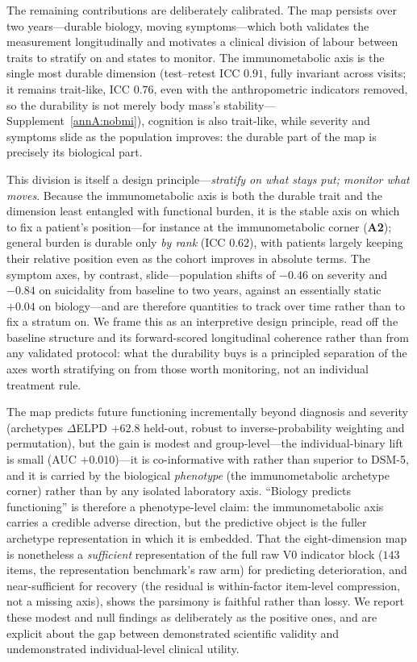 The remaining contributions are deliberately calibrated. The map persists over two
years---durable biology, moving symptoms---which both validates the measurement
longitudinally and motivates a clinical division of labour between traits to stratify
on and states to monitor. The immunometabolic axis is the single most durable
dimension (test--retest ICC $0.91$, fully invariant across visits; it remains trait-like,
ICC $0.76$, even with the anthropometric indicators removed, so the durability is not merely
body mass's stability---Supplement~\ref{annA:nobmi}), cognition is also
trait-like, while severity and symptoms slide as the population improves: the durable
part of the map is precisely its biological part.

This division is itself a design principle---\emph{stratify on what stays put; monitor
what moves}. Because the immunometabolic axis is both the durable trait and the
dimension least entangled with functional burden, it is the stable axis on which to fix a
patient's position---for instance at the immunometabolic corner (\textbf{A2}); general
burden is durable only \emph{by rank} (ICC $0.62$), with patients largely keeping their
relative position even as the cohort improves in absolute terms. The symptom axes, by
contrast, slide---population shifts of $-0.46$ on severity and $-0.84$ on suicidality from
baseline to two years, against an essentially static $+0.04$ on biology---and are
therefore quantities to track over time rather than to fix a stratum on. We frame this as
an interpretive design principle, read off the baseline structure and its forward-scored
longitudinal coherence rather than from any validated protocol: what the durability buys
is a principled separation of the axes worth stratifying on from those worth monitoring,
not an individual treatment rule.

The map predicts future functioning
incrementally beyond diagnosis and severity (archetypes $\Delta$ELPD $+62.8$
held-out, robust to inverse-probability weighting and permutation), but the gain is
modest and group-level---the individual-binary lift is small (AUC $+0.010$)---it is
co-informative with rather than superior to DSM-5, and it is carried by the biological
\emph{phenotype} (the immunometabolic archetype corner) rather than by any isolated
laboratory axis. ``Biology predicts functioning'' is therefore a phenotype-level
claim: the immunometabolic axis carries a credible adverse direction, but the
predictive object is the fuller archetype representation in which it is embedded. That
the eight-dimension map is nonetheless a \emph{sufficient} representation of the full raw
V0 indicator block ($143$ items, the representation benchmark's raw arm) for predicting
deterioration, and near-sufficient for recovery (the residual
is within-factor item-level compression, not a missing axis), shows the parsimony is
faithful rather than lossy. We report these modest and null findings as deliberately as the positive ones, and are explicit about the gap between demonstrated scientific validity and undemonstrated individual-level clinical utility.

